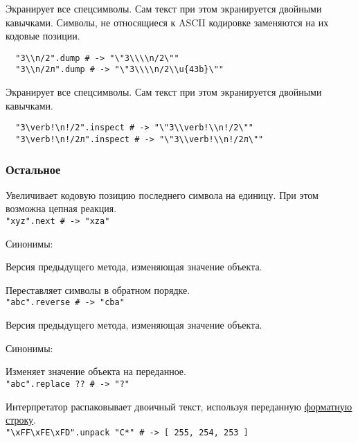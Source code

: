 \begin{methodlist}
  Экранирует все спецсимволы. Сам текст при этом экранируется двойными кавычками. Символы, не относящиеся к ASCII кодировке заменяются на их кодовые позиции.
  \begin{verbatim}
  "3\\n/2".dump # -> "\"3\\\\n/2\""
  "3\\n/2л".dump # -> "\"3\\\\n/2\\u{43b}\""
  \end{verbatim}

  Экранирует все спецсимволы. Сам текст при этом экранируется двойными кавычками.
  \begin{verbatim}
  "3\verb!\n!/2".inspect # -> "\"3\\verb!\\n!/2\""
  "3\verb!\n!/2л".inspect # -> "\"3\\verb!\\n!/2л\""
  \end{verbatim}
\end{methodlist}

\subsubsection*{Остальное}

\begin{methodlist}

  Увеличивает кодовую позицию последнего символа на единицу. При этом возможна цепная реакция.
  \\\verb!"xyz".next # -> "xza"!

  Синонимы: 

  Версия предыдущего метода, изменяющая значение объекта.

  Переставляет символы в обратном порядке.
  \\\verb!"abc".reverse # -> "cba"!

  Версия предыдущего метода, изменяющая значение объекта.

  Синонимы: 

  Изменяет значение объекта на переданное.
  \\\verb!"abc".replace ?? # -> "?"!

  Интерпретатор распаковывает двоичный текст, используя переданную \hyperlink{apppack}{\underline{форматную строку}}.
  \\\verb!"\xFF\xFE\xFD".unpack "C*" # -> [ 255, 254, 253 ]!
\end{methodlist}


